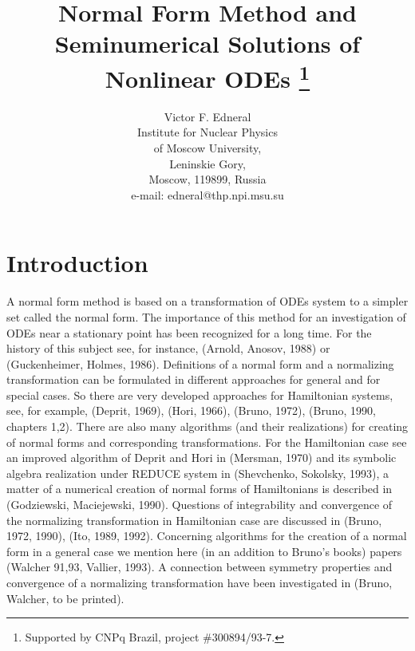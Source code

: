 


\title[Normal Form Method and Solutions of Nonlinear ODEs]
{Normal Form Method and Seminumerical Solutions of Nonlinear ODEs
                 \thanks{Supported by CNPq Brazil, project \#300894/93-7.}}

\author[V.F.Edneral]{Victor F. Edneral%
\\
         Institute for Nuclear Physics\\
         of Moscow University,\\
         Leninskie Gory,\\
         Moscow, 119899, Russia\\
         e-mail: edneral@thp.npi.msu.su}

\date{}



\maketitle


\section{Introduction}

\noindent
    A normal form method is based on a transformation of ODEs
system to a simpler set called the normal form. The importance of
this method for an investigation of ODEs near a stationary point
has been recognized for a long time. For the history of this subject
see, for instance, (Arnold, Anosov, 1988) or (Guckenheimer, Holmes, 
1986). Definitions of a normal form and a normalizing transformation
can be formulated in different approaches  for general and for
special cases. So there are very developed approaches for Hamiltonian 
systems, see, for example, (Deprit, 1969), (Hori, 1966), (Bruno, 1972), 
(Bruno, 1990, chapters 1,2). There are also many algorithms (and their 
realizations) for creating of normal forms and corresponding 
transformations. For the Hamiltonian case see an improved algorithm of 
Deprit and Hori in (Mersman, 1970) and its symbolic algebra realization
under REDUCE system in (Shevchenko, Sokolsky, 1993), a matter of a 
numerical creation of normal forms of Hamiltonians is described in 
(Godziewski, Maciejewski, 1990). Questions of integrability and 
convergence of the normalizing transformation in Hamiltonian case are
discussed in (Bruno, 1972, 1990), (Ito, 1989, 1992). Concerning 
algorithms for the creation of a normal form in a general case we 
mention here (in an addition to Bruno's books) papers (Walcher 91,93, 
Vallier, 1993). A connection between symmetry properties and convergence 
of a normalizing transformation have been investigated in (Bruno, 
Walcher, to be printed).

